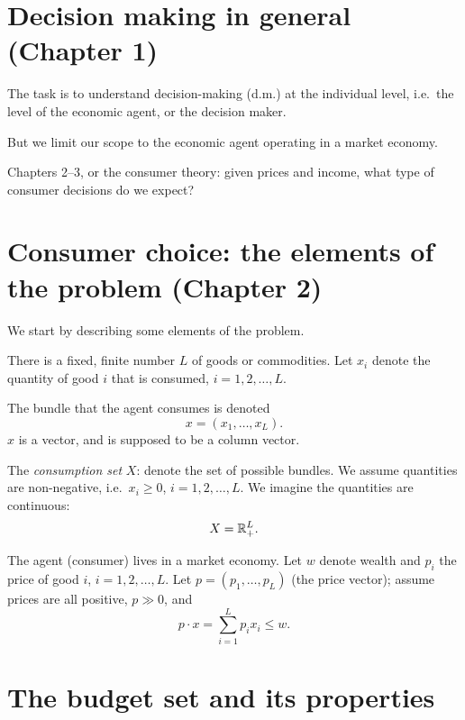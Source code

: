 \documentclass[11pt]{article}
\begin{document}


\section{Decision making in general (Chapter 1)}

The task is to understand decision-making (d.m.) at the individual level, i.e.\ the
level of the economic agent, or the decision maker.

But we limit our scope to the economic agent operating in a market economy.

Chapters 2--3, or the consumer theory: given prices and income, what type of
consumer decisions do we expect?

\section{Consumer choice: the elements of the problem (Chapter 2)}

We start by describing some elements of the problem.

\begin{flatnum}
  \item There is a fixed, finite number $L$ of goods or commodities. Let $x_i$ denote the quantity of good $i$ that is consumed,
        $i=1,2,\dots,L$.

        The bundle that the agent consumes is denoted
        \[ x=(x_1,\dots,x_L). \]
        $x$ is a vector, and is supposed to be a column vector.

  \item The \emph{consumption set} $X$: denote the set of possible bundles. We
        assume quantities are non-negative, i.e.\ $x_i\ge 0$,
        $i=1,2,\dots,L$. We imagine the quantities are continuous:
        \[ X=\mathbb{R}^L_+. \]

  \item The agent (consumer) lives in a market economy. Let $w$ denote wealth and
        $p_i$ the price of good $i$, $i=1,2,\dots,L$. Let
        $p=(p_1,\dots,p_L)$ (the price vector); assume prices are all positive, $p\gg 0$, and
        \[ p\cdot x=\sum_{i=1}^{L}p_ix_i\le w. \]
\end{flatnum}

\section{The budget set and its properties}
\end{document}
